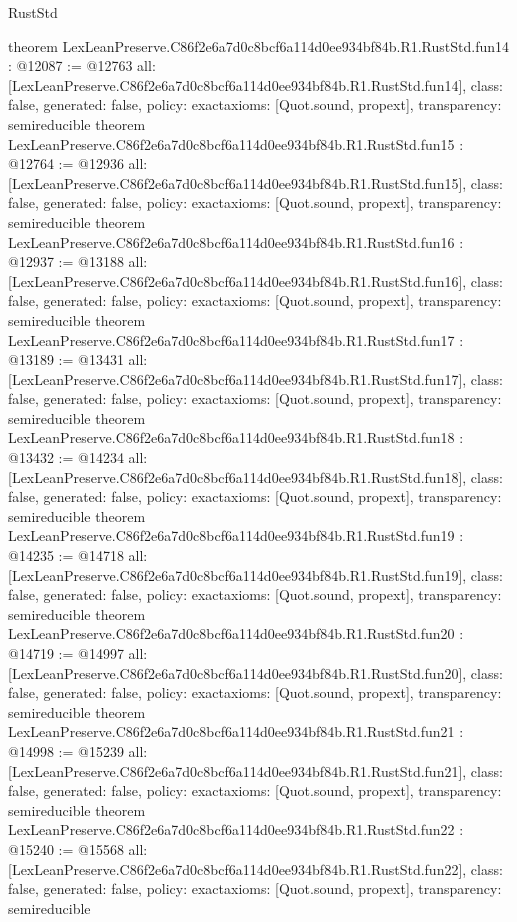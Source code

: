 \begin{lexlean}{RustStd}
\begin{coremodule}
{}
theorem LexLeanPreserve.C86f2e6a7d0c8bcf6a114d0ee934bf84b.R1.RustStd.fun14 : @12087 := @12763 {
  all: [LexLeanPreserve.C86f2e6a7d0c8bcf6a114d0ee934bf84b.R1.RustStd.fun14],
  class: false,
  generated: false,
  policy: exact{axioms: [Quot.sound, propext]},
  transparency: semireducible
}
theorem LexLeanPreserve.C86f2e6a7d0c8bcf6a114d0ee934bf84b.R1.RustStd.fun15 : @12764 := @12936 {
  all: [LexLeanPreserve.C86f2e6a7d0c8bcf6a114d0ee934bf84b.R1.RustStd.fun15],
  class: false,
  generated: false,
  policy: exact{axioms: [Quot.sound, propext]},
  transparency: semireducible
}
theorem LexLeanPreserve.C86f2e6a7d0c8bcf6a114d0ee934bf84b.R1.RustStd.fun16 : @12937 := @13188 {
  all: [LexLeanPreserve.C86f2e6a7d0c8bcf6a114d0ee934bf84b.R1.RustStd.fun16],
  class: false,
  generated: false,
  policy: exact{axioms: [Quot.sound, propext]},
  transparency: semireducible
}
theorem LexLeanPreserve.C86f2e6a7d0c8bcf6a114d0ee934bf84b.R1.RustStd.fun17 : @13189 := @13431 {
  all: [LexLeanPreserve.C86f2e6a7d0c8bcf6a114d0ee934bf84b.R1.RustStd.fun17],
  class: false,
  generated: false,
  policy: exact{axioms: [Quot.sound, propext]},
  transparency: semireducible
}
theorem LexLeanPreserve.C86f2e6a7d0c8bcf6a114d0ee934bf84b.R1.RustStd.fun18 : @13432 := @14234 {
  all: [LexLeanPreserve.C86f2e6a7d0c8bcf6a114d0ee934bf84b.R1.RustStd.fun18],
  class: false,
  generated: false,
  policy: exact{axioms: [Quot.sound, propext]},
  transparency: semireducible
}
theorem LexLeanPreserve.C86f2e6a7d0c8bcf6a114d0ee934bf84b.R1.RustStd.fun19 : @14235 := @14718 {
  all: [LexLeanPreserve.C86f2e6a7d0c8bcf6a114d0ee934bf84b.R1.RustStd.fun19],
  class: false,
  generated: false,
  policy: exact{axioms: [Quot.sound, propext]},
  transparency: semireducible
}
theorem LexLeanPreserve.C86f2e6a7d0c8bcf6a114d0ee934bf84b.R1.RustStd.fun20 : @14719 := @14997 {
  all: [LexLeanPreserve.C86f2e6a7d0c8bcf6a114d0ee934bf84b.R1.RustStd.fun20],
  class: false,
  generated: false,
  policy: exact{axioms: [Quot.sound, propext]},
  transparency: semireducible
}
theorem LexLeanPreserve.C86f2e6a7d0c8bcf6a114d0ee934bf84b.R1.RustStd.fun21 : @14998 := @15239 {
  all: [LexLeanPreserve.C86f2e6a7d0c8bcf6a114d0ee934bf84b.R1.RustStd.fun21],
  class: false,
  generated: false,
  policy: exact{axioms: [Quot.sound, propext]},
  transparency: semireducible
}
theorem LexLeanPreserve.C86f2e6a7d0c8bcf6a114d0ee934bf84b.R1.RustStd.fun22 : @15240 := @15568 {
  all: [LexLeanPreserve.C86f2e6a7d0c8bcf6a114d0ee934bf84b.R1.RustStd.fun22],
  class: false,
  generated: false,
  policy: exact{axioms: [Quot.sound, propext]},
  transparency: semireducible
}
\end{coremodule}
\end{lexlean}
